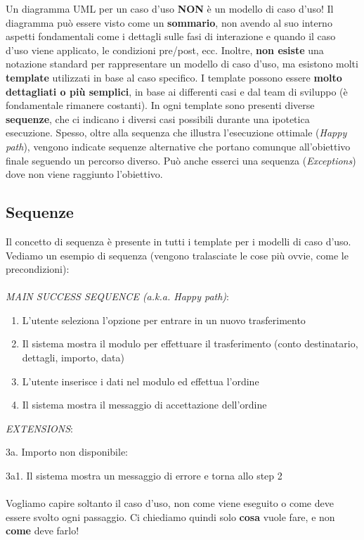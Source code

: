 \documentclass{article}
\begin{document}
Un diagramma UML per un caso d'uso \textbf{NON} è un modello di caso d'uso! Il diagramma può essere visto come un \textbf{sommario}, non avendo al suo interno aspetti fondamentali come i dettagli sulle fasi di interazione e quando il caso d'uso viene applicato, le condizioni pre/post, ecc. Inoltre, \textbf{non esiste} una notazione standard per rappresentare un modello di caso d'uso, ma esistono molti \textbf{template} utilizzati in base al caso specifico. I template possono essere \textbf{molto dettagliati o più semplici}, in base ai differenti casi e dal team di sviluppo (è fondamentale rimanere costanti). In ogni template sono presenti diverse \textbf{sequenze}, che ci indicano i diversi casi possibili durante una ipotetica esecuzione. Spesso, oltre alla sequenza che illustra l'esecuzione ottimale (\textit{Happy path}), vengono indicate sequenze alternative che portano comunque all'obiettivo finale seguendo un percorso diverso. Può anche esserci una sequenza (\textit{Exceptions}) dove non viene raggiunto l'obiettivo.

\subsection*{Sequenze}
\large

Il concetto di sequenza è presente in tutti i template per i modelli di caso d'uso. Vediamo un esempio di sequenza (vengono tralasciate le cose più ovvie, come le precondizioni):\\ \\
\textit{MAIN SUCCESS SEQUENCE (a.k.a. Happy path)}:
\begin{enumerate}
    \item L'utente seleziona l'opzione per entrare in un nuovo trasferimento
    \item Il sistema mostra il modulo per effettuare il trasferimento (conto destinatario, dettagli, importo, data)
    \item L'utente inserisce i dati nel modulo ed effettua l'ordine
    \item Il sistema mostra il messaggio di accettazione dell'ordine
\end{enumerate}
\textit{EXTENSIONS}:

3a. Importo non disponibile:

3a1. Il sistema mostra un messaggio di errore e torna allo step 2\\ \\
Vogliamo capire soltanto il caso d'uso, non come viene eseguito o come deve essere svolto ogni passaggio. Ci chiediamo quindi solo \textbf{cosa} vuole fare, e non \textbf{come} deve farlo!
\end{document}
